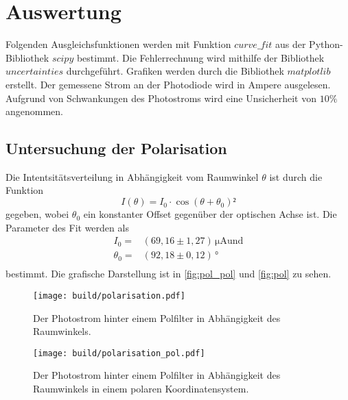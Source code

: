 \section{Auswertung}
\label{sec:auswertung}

Folgenden Ausgleichsfunktionen werden mit Funktion $curve\_fit$ aus der Python\cite{py}-Bibliothek $scipy$\cite{2020SciPy-NMeth} bestimmt.
Die Fehlerrechnung wird mithilfe der Bibliothek $uncertainties$ \cite{unp} durchgeführt.
Grafiken werden durch die Bibliothek $matplotlib$\cite{Hunter:2007} erstellt. Der gemessene Strom an der Photodiode wird in Ampere ausgelesen.  
Aufgrund von Schwankungen des Photostroms wird eine Unsicherheit von $10 \%$ angenommen.

\subsection{Untersuchung der Polarisation}
\label{sec:Polarisation}

Die Intentsitätsverteilung in Abhängigkeit vom Raumwinkel $\theta$ ist durch die Funktion
\begin{equation*}
    I(\theta) = I_0 \cdot \cos(\theta + \theta_0)² %
\end{equation*}
gegeben, wobei $\theta_0 $ ein konstanter Offset gegenüber der optischen Achse ist. 
Die Parameter des Fit werden als
\begin{align*}
    I_0      =& (69,16 \pm    1,27) \, \unit{\micro\ampere}   \text{und}  \\
    \theta_0 =& (92,18 \pm    0,12) \, °                        \\
\end{align*}
bestimmt. Die grafische Darstellung ist in  \autoref{fig:pol_pol} und \autoref{fig:pol} zu sehen.

\begin{figure}[H]
    \centering
    \texttt{[image: build/polarisation.pdf]}
    \caption{Der Photostrom hinter einem Polfilter in Abhängigkeit des Raumwinkels.}
    \label{fig:pol}
\end{figure}

\begin{figure}[H]
    \centering
    \texttt{[image: build/polarisation\_pol.pdf]}
    \caption{Der Photostrom hinter einem Polfilter in Abhängigkeit des Raumwinkels in einem polaren Koordinatensystem.}
    \label{fig:pol_pol}
\end{figure}

